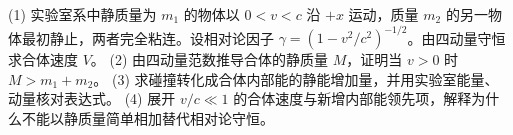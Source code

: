 (1) 实验室系中静质量为 \(m_1\) 的物体以 \(0<v<c\) 沿 \(+x\) 运动，质量 \(m_2\) 的另一物体最初静止，两者完全粘连。设相对论因子 \(\gamma=(1-v^2/c^2)^{-1/2}\)。由四动量守恒求合体速度 \(V\)。
(2) 由四动量范数推导合体的静质量 \(M\)，证明当 \(v>0\) 时 \(M>m_1+m_2\)。
(3) 求碰撞转化成合体内部能的静能增加量，并用实验室能量、动量核对表达式。
(4) 展开 \(v/c\ll1\) 的合体速度与新增内部能领先项，解释为什么不能以静质量简单相加替代相对论守恒。
